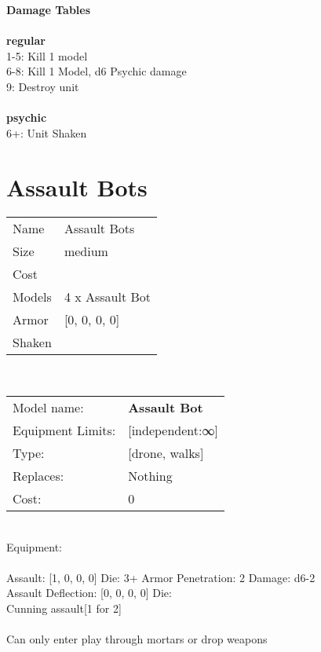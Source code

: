 {\bf Damage Tables} \\
\ \\ {\bf regular } \\
1-5: Kill 1 model \\
6-8: Kill 1 Model, d6 Psychic damage \\
9: Destroy unit \\
\ \\ {\bf psychic } \\
6+: Unit Shaken \\










\pagebreak\pagebreak

\section{ Assault Bots }

\begin{tabular}{ll}
  Name & Assault Bots \\
  Size & medium\\
  Cost & \\
  Models & 4 x Assault Bot\\
  Armor & [0, 0, 0, 0]\\
  Shaken & \\
\end{tabular}

\noindent \\ 


\noindent
\begin{tabular}{ll}
Model name: &{\bf Assault Bot } \\
Equipment Limits: &[independent:∞] \\
Type: &[drone, walks] \\
Replaces: &Nothing \\
Cost: & 0\\
\end{tabular}
\ \\
Equipment:  \\
\ \\
Assault: [1, 0, 0, 0] Die: 3+ Armor Penetration: 2 Damage: d6-2 \\
Assault Deflection: [0, 0, 0, 0] Die: \\
\indent Cunning assault[1 for 2]\\ 
 
\ \\
Can only enter play through mortars or drop weapons\\ 

